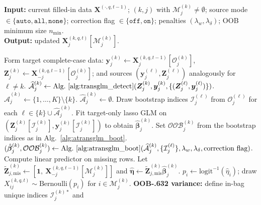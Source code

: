 \documentclass[12pt]{article}
\begin{document}
\begin{algorithm}[t]
\footnotesize
\caption{One chained-equation update for task $k$, variable $j$ at $(q,t)$}
\label{alg:one_update}
\textbf{Input:} current filled-in data $\bm{X}^{(\cdot,q,t-1)}$; $(k,j)$ with $\mathcal{M}^{(k)}_j\neq\emptyset$;
source mode $\in\{\texttt{auto},\texttt{all},\texttt{none}\}$; correction flag $\in\{\texttt{off},\texttt{on}\}$;
penalties $(\lambda_w,\lambda_\delta)$; OOB minimum size $n_{\min}$.\\
\textbf{Output:} updated $\bm{X}^{(k,q,t)}_j[\mathcal{M}^{(k)}_j]$.
\begin{algorithmic}[1]
\State Form target complete-case data:
$\bm{y}^{(k)}_{j}\leftarrow \bm{X}^{(k,q,t-1)}_j[\mathcal{O}^{(k)}_j]$,
$\bm{Z}^{(k)}_{j}\leftarrow \bm{X}^{(k,q,t-1)}_{-j}[\mathcal{O}^{(k)}_j]$;
and sources $(\bm{y}^{(\ell)}_j,\bm{Z}^{(\ell)}_j)$ analogously for $\ell\neq k$.
  \State $\widehat{\mathcal{A}}^{(k)}_j \leftarrow \text{Alg.~\ref{alg:transglm_detect}}(\bm{Z}^{(k)}_j,\bm{y}^{(k)}_j,\{(\bm{Z}^{(\ell)}_j,\bm{y}^{(\ell)}_j)\})$.
  \State $\widehat{\mathcal{A}}^{(k)}_j \leftarrow \{1,\dots,K\}\setminus\{k\}$.
\Else
  \State $\widehat{\mathcal{A}}^{(k)}_j \leftarrow \emptyset$.
\EndIf
\State Draw bootstrap indices $\mathcal{I}^{(\ell)}_j$ from $\mathcal{O}^{(\ell)}_j$ for each $\ell\in\{k\}\cup\widehat{\mathcal{A}}^{(k)}_j$.
  \State Fit target-only lasso GLM on $(\bm{Z}^{(k)}_j[\mathcal{I}^{(k)}_j],\bm{y}^{(k)}_j[\mathcal{I}^{(k)}_j])$ to obtain $\hat{\bm{\beta}}^{(k)}_j$.
  \State Set $\mathcal{OOB}^{(k)}_j$ from the bootstrap indices as in Alg.~\ref{alg:atransglm_boot}.
\Else
  \State $(\hat{\bm{\beta}}^{(k)}_j,\mathcal{OOB}^{(k)}_j)\leftarrow \text{Alg.~\ref{alg:atransglm_boot}}(\widehat{\mathcal{A}}^{(k)}_j,\{\mathcal{I}^{(\ell)}_j\},\lambda_w,\lambda_\delta,\text{correction flag})$.
\EndIf
\State Compute linear predictor on missing rows. Let $\tilde{\bm{Z}}^{(k)}_{j,\mathrm{mis}}\leftarrow [\bm{1},\ \bm{X}^{(k,q,t-1)}_{-j}[\mathcal{M}^{(k)}_j]]$ and
$\hat{\bm{\eta}}\leftarrow \tilde{\bm{Z}}^{(k)}_{j,\mathrm{mis}}\hat{\bm{\beta}}^{(k)}_j$.
  \State $p_i\leftarrow \mathrm{logit}^{-1}(\hat{\eta}_i)$; draw $X^{(k,q,t)}_{ij}\sim\mathrm{Bernoulli}(p_i)$ for $i\in\mathcal{M}^{(k)}_j$.
\Else
  \State \textbf{OOB-.632 variance:} define in-bag unique indices $\mathcal{I}^{(k)\ast}_j$ and

\end{algorithmic}
\end{algorithm}
\end{document}
